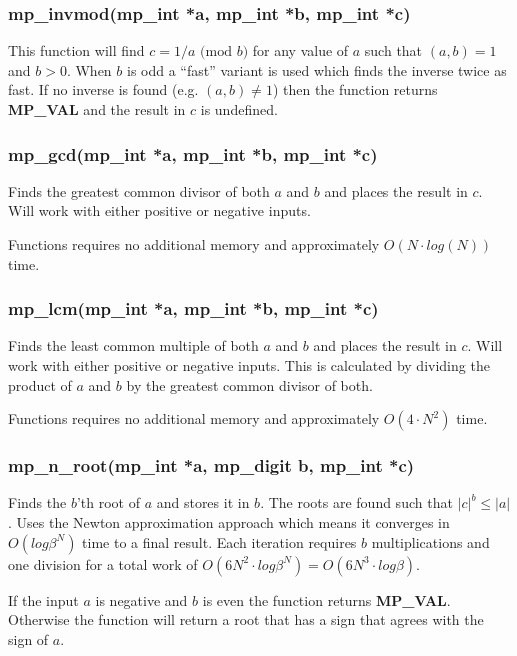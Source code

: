 \documentclass{article}
\begin{document}
\subsubsection{mp\_invmod(mp\_int *a, mp\_int *b, mp\_int *c)}
This function will find $c = 1/a \mbox{ (mod }b\mbox{)}$ for any value of $a$ such that $(a, b) = 1$ and $b > 0$.  When
$b$ is odd a ``fast'' variant is used which finds the inverse twice as fast.  If no inverse is found (e.g. $(a, b) \ne 1$) then
the function returns \textbf{MP\_VAL} and the result in $c$ is undefined.

\subsubsection{mp\_gcd(mp\_int *a, mp\_int *b, mp\_int *c)}
Finds the greatest common divisor of both $a$ and $b$ and places the result in $c$.  Will work with either positive
or negative inputs.  

Functions requires no additional memory and approximately $O(N \cdot log(N))$ time.

\subsubsection{mp\_lcm(mp\_int *a, mp\_int *b, mp\_int *c)}
Finds the least common multiple of both $a$ and $b$ and places the result in $c$.  Will work with either positive
or negative inputs.  This is calculated by dividing the product of $a$ and $b$ by the greatest common divisor of 
both.  

Functions requires no additional memory and approximately $O(4 \cdot N^2)$ time.

\subsubsection{mp\_n\_root(mp\_int *a, mp\_digit b, mp\_int *c)}
Finds the $b$'th root of $a$ and stores it in $b$.  The roots are found such that $\vert c \vert^b \le \vert a \vert$.  
Uses the Newton approximation approach which means it converges in $O(log \beta^N)$ time to a final result.  Each iteration
requires $b$ multiplications and one division for a total work of $O(6N^2 \cdot log \beta^N) = O(6N^3 \cdot log \beta)$.

If the input $a$ is negative and $b$ is even the function returns \textbf{MP\_VAL}.  Otherwise the function will 
return a root that has a sign that agrees with the sign of $a$.
\end{document}
